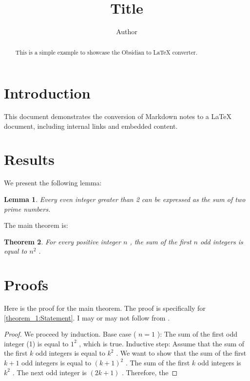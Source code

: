 \documentclass{article}
\title{Title}
\author{Author}
\newtheorem{theorem}{Theorem}
\newtheorem{lemma}[theorem]{Lemma}
\begin{document}
\maketitle
\begin{abstract}
This is a simple example to showcase the Obsidian to LaTeX converter.

\end{abstract}

\section{Introduction}\label{section:Introduction}
This document demonstrates the conversion of Markdown notes to a LaTeX document, including internal links and embedded content.
\section{Results}\label{section:Results}
We present the following lemma:
\begin{lemma}
\label{lemma_1:Statement}
Every even integer greater than 2 can be expressed as the sum of two prime numbers.

\end{lemma}
The main theorem is:
\begin{theorem}
\label{theorem_1:Statement}
For every positive integer  $n$ , the sum of the first  $n$  odd integers is equal to  $n^2$ .

\end{theorem}

\section{Proofs}\label{section:Proofs}
Here is the proof for the main theorem. The proof is specifically for \autoref{theorem_1:Statement}. I may or may not follow from \cite{rudelsonSparseReconstructionFourier2008}.
\begin{proof}
We proceed by induction.
Base case ( $n = 1$ ): The sum of the first odd integer (1) is equal to  $1^2$ , which is true.
Inductive step: Assume that the sum of the first  $k$  odd integers is equal to  $k^2$ . We want to show that the sum of the first  $k+1$  odd integers is equal to  $(k+1)^2$ .
The sum of the first  $k$  odd integers is  $k^2$ . The next odd integer is  $(2k+1)$ . Therefore, the

\end{proof}

\printbibliography
\end{document}
